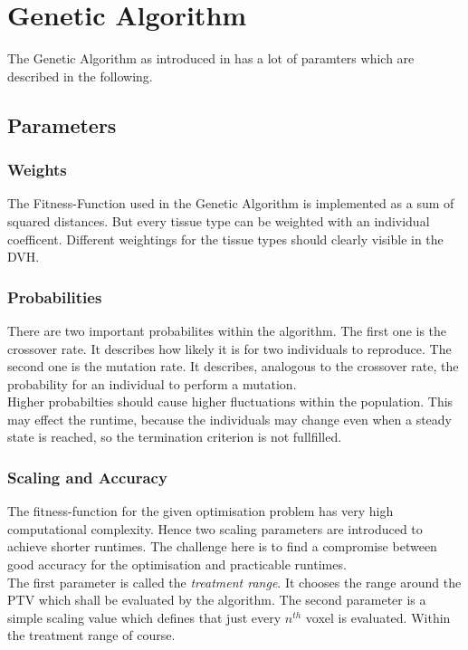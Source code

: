 \documentclass[USenglish,twocolumn]{article}
\begin{document}
\section{Genetic Algorithm}
The Genetic Algorithm as introduced in \citep{1} has a lot of paramters which are described in the following. 

\subsection{Parameters}

\subsubsection{Weights}
The Fitness-Function used in the Genetic Algorithm is implemented as a sum of squared distances. But every tissue type can be weighted with an individual coefficent. Different weightings for the tissue types should clearly visible in the DVH. 

\subsubsection{Probabilities} 
There are two important probabilites within the algorithm. The first one is the crossover rate. It describes how likely it is for two individuals to reproduce. The second one is the mutation rate. It describes, analogous to the crossover rate, the probability for an individual to perform a mutation. \\
Higher probabilties should cause higher fluctuations within the population. This may effect the runtime, because the individuals may change even when a steady state is reached, so the termination criterion is not fullfilled.   

\subsubsection{Scaling and Accuracy}
The fitness-function for the given optimisation problem has very high computational complexity. Hence two scaling parameters are introduced to achieve shorter runtimes. The challenge here is to find a compromise between good accuracy for the optimisation and practicable runtimes.\\ The first parameter is called the \textit{treatment range}. It chooses the range around the PTV which shall be evaluated by the algorithm. The second parameter is a simple scaling value which defines that just every  $n^{th}$ voxel is evaluated. Within the treatment range of course.
\end{document}
